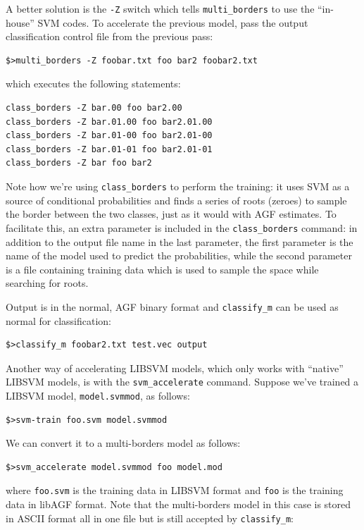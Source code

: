 \documentclass[12pt]{article}
\begin{document}
A better solution is the \verb/-Z/ switch which tells \verb/multi_borders/ 
to use the ``in-house'' SVM codes.
To accelerate the previous model, pass the output classification control file from the previous pass:

\begin{verbatim}
$>multi_borders -Z foobar.txt foo bar2 foobar2.txt
\end{verbatim}

which executes the following statements:

\begin{verbatim}
class_borders -Z bar.00 foo bar2.00
class_borders -Z bar.01.00 foo bar2.01.00
class_borders -Z bar.01-00 foo bar2.01-00
class_borders -Z bar.01-01 foo bar2.01-01
class_borders -Z bar foo bar2
\end{verbatim}

Note how we're using \verb/class_borders/ to perform the training: it uses SVM as a source of conditional probabilities and finds a series of roots (zeroes) to sample the border between the two classes, just as it would with AGF estimates.  
To facilitate this, an extra parameter is included in the \verb/class_borders/ command: in addition to the output file name in the last parameter, the first parameter is the name of the model used to predict the probabilities, 
while the second parameter is a file containing training data which is used to sample the space while searching for roots.  

Output is in the normal, AGF binary format and \verb/classify_m/ can be used as normal for classification:

\begin{verbatim}
$>classify_m foobar2.txt test.vec output
\end{verbatim}

Another way of accelerating LIBSVM models, which only works with ``native''
LIBSVM models, is with the \verb/svm_accelerate/ command.
Suppose we've trained a LIBSVM model, \verb/model.svmmod/, as follows:

\begin{verbatim}
$>svm-train foo.svm model.svmmod
\end{verbatim}

We can convert it to a multi-borders model as follows:

\begin{verbatim}
$>svm_accelerate model.svmmod foo model.mod
\end{verbatim}

where \verb/foo.svm/ is the training data in LIBSVM format and \verb/foo/
is the training data in libAGF format. Note that the multi-borders model
in this case is stored in ASCII format all in one file but is still 
accepted by \verb/classify_m/:
\end{document}
